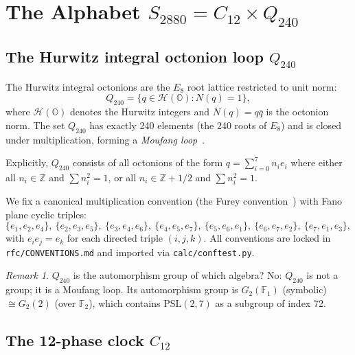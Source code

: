 \documentclass[11pt,a4paper]{article}
\theoremstyle{remark}
\newtheorem{remark}[theorem]{Remark}
\begin{document}
\section{The Alphabet $S_{2880} = C_{12} \times Q_{240}$}
\label{sec:alphabet}

\subsection{The Hurwitz integral octonion loop $Q_{240}$}
\label{subsec:q240}

The Hurwitz integral octonions are the $E_8$ root lattice restricted to unit norm:
\begin{equation}
  Q_{240} = \{ q \in \mathcal{H}(\mathbb{O}) : N(q) = 1 \} ,
\end{equation}
where $\mathcal{H}(\mathbb{O})$ denotes the Hurwitz integers and $N(q) = q\bar q$ is
the octonion norm.  The set $Q_{240}$ has exactly 240 elements (the 240 roots of $E_8$)
and is closed under multiplication, forming a \emph{Moufang loop}~\cite{ConwaySloane1988}.

Explicitly, $Q_{240}$ consists of all octonions of the form
$q = \sum_{i=0}^7 n_i e_i$ where either all $n_i \in \mathbb{Z}$ and $\sum n_i^2 = 1$,
or all $n_i \in \mathbb{Z} + 1/2$ and $\sum n_i^2 = 1$.

We fix a canonical multiplication convention (the Furey convention~\cite{Furey2018})
with Fano plane cyclic triples:
\begin{equation}
  \{e_1,e_2,e_4\},\ \{e_2,e_3,e_5\},\ \{e_3,e_4,e_6\},\
  \{e_4,e_5,e_7\},\ \{e_5,e_6,e_1\},\ \{e_6,e_7,e_2\},\ \{e_7,e_1,e_3\} ,
\end{equation}
with $e_i e_j = e_k$ for each directed triple $(i,j,k)$.  All conventions are locked in
\texttt{rfc/CONVENTIONS.md} and imported via \texttt{calc/conftest.py}.

\begin{remark}
  $Q_{240}$ is the automorphism group of which algebra? No: $Q_{240}$ is not a group;
  it is a Moufang loop.  Its automorphism group is $G_2(\mathbb{F}_1)$ (symbolic)
  $\cong G_2(2)$ (over $\mathbb{F}_2$), which contains $\mathrm{PSL}(2,7)$ as a subgroup
  of index 72.
\end{remark}

\subsection{The 12-phase clock $C_{12}$}
\end{document}
